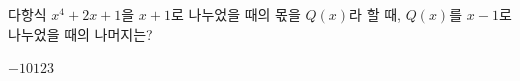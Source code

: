 다항식 $x^4+2x+1$을 $x+1$로 나누었을 때의 몫을 $Q(x)$라 할 때, $Q(x)$를 $x-1$로 나누었을 때의 나머지는?
\begin{choices32}{$-1$}{$0$}{$1$}{$2$}{$3$}\end{choices32}
